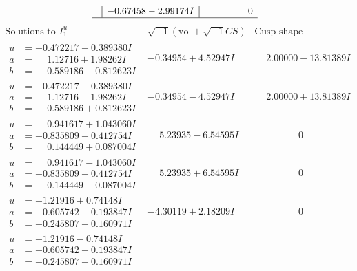 \documentclass[1p]{elsarticle_modified}
\theoremstyle{definition}
\newcommand{\I}{\sqrt{-1}}
\begin{document}
$$\begin{array}{c|c|c}
 & -0.67458 - 2.99174 I & \phantom{-0.000000 } 0\\
 \hline 
 \end{array}$$\newpage$$\begin{array}{c|c|c}  
\text{Solutions to }I^u_{1}& \I (\text{vol} + \sqrt{-1}CS) & \text{Cusp shape}\\
 \hline 
\begin{aligned}
u &= -0.472217 + 0.389380 I \\
a &= \phantom{-}1.12716 + 1.98262 I \\
b &= \phantom{-}0.589186 - 0.812623 I\end{aligned}
 & -0.34954 + 4.52947 I & \phantom{-}2.00000 - 13.81389 I \\ \hline\begin{aligned}
u &= -0.472217 - 0.389380 I \\
a &= \phantom{-}1.12716 - 1.98262 I \\
b &= \phantom{-}0.589186 + 0.812623 I\end{aligned}
 & -0.34954 - 4.52947 I & \phantom{-}2.00000 + 13.81389 I \\ \hline\begin{aligned}
u &= \phantom{-}0.941617 + 1.043060 I \\
a &= -0.835809 - 0.412754 I \\
b &= \phantom{-}0.144449 + 0.087004 I\end{aligned}
 & \phantom{-}5.23935 - 6.54595 I & \phantom{-0.000000 } 0 \\ \hline\begin{aligned}
u &= \phantom{-}0.941617 - 1.043060 I \\
a &= -0.835809 + 0.412754 I \\
b &= \phantom{-}0.144449 - 0.087004 I\end{aligned}
 & \phantom{-}5.23935 + 6.54595 I & \phantom{-0.000000 } 0 \\ \hline\begin{aligned}
u &= -1.21916 + 0.74148 I \\
a &= -0.605742 + 0.193847 I \\
b &= -0.245807 - 0.160971 I\end{aligned}
 & -4.30119 + 2.18209 I & \phantom{-0.000000 } 0 \\ \hline\begin{aligned}
u &= -1.21916 - 0.74148 I \\
a &= -0.605742 - 0.193847 I \\
b &= -0.245807 + 0.160971 I\end{aligned}

\end{array}$$
\end{document}
